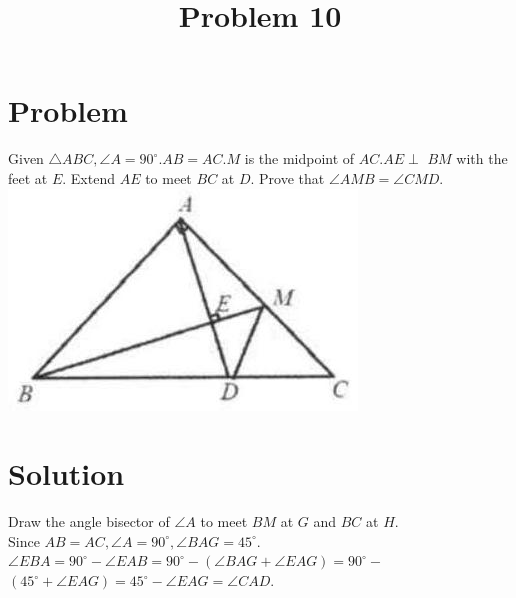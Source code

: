 \documentclass{article}
\title{Problem 10}
\date{}
\begin{document}
\maketitle

\section*{Problem}
Given \(\triangle A B C, \angle A=90^{\circ} . A B=A C . M\) is the midpoint of \(A C . A E \perp\) \(B M\) with the feet at \(E\). Extend \(A E\) to meet \(B C\) at \(D\). Prove that \(\angle A M B=\angle C M D\).\\
\centering
\includegraphics[width=\textwidth]{images/problem_image_1.jpg}

\section*{Solution}
Draw the angle bisector of \(\angle A\) to meet \(B M\) at \(G\) and \(B C\) at \(H\).\\
Since \(A B=A C, \angle A=90^{\circ}, \angle B A G=45^{\circ}\).\\
\(\angle E B A=90^{\circ}-\angle E A B=90^{\circ}-(\angle B A G+\angle E A G)=90^{\circ}-\) \(\left(45^{\circ}+\angle E A G\right)=45^{\circ}-\angle E A G=\angle C A D\).
\end{document}
